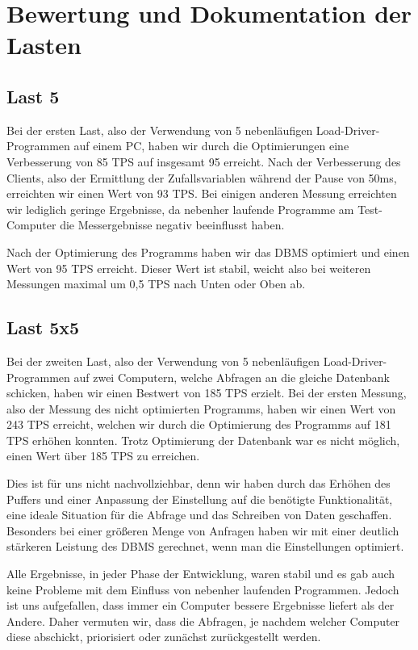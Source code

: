 \section{Bewertung und Dokumentation der Lasten}

\subsection{Last 5}
Bei der ersten Last, also der Verwendung von 5 nebenläufigen
Load-Driver-Programmen auf einem PC, haben wir durch die Optimierungen eine
Verbesserung von 85 TPS auf insgesamt 95 erreicht. Nach der Verbesserung des
Clients, also der Ermittlung der Zufallsvariablen während der Pause von 50ms,
erreichten wir einen Wert von 93 TPS. Bei einigen anderen Messung erreichten
wir lediglich geringe Ergebnisse, da nebenher laufende Programme am
Test-Computer die Messergebnisse negativ beeinflusst haben.

Nach der Optimierung des Programms haben wir das DBMS optimiert und einen Wert
von 95 TPS erreicht. Dieser Wert ist stabil, weicht also bei weiteren Messungen
maximal um 0,5 TPS nach Unten oder Oben ab.


\subsection{Last 5x5}
Bei der zweiten Last, also der Verwendung von 5 nebenläufigen
Load-Driver-Programmen auf zwei Computern, welche Abfragen an die gleiche
Datenbank schicken, haben wir einen Bestwert von 185 TPS erzielt. Bei der
ersten Messung, also der Messung des nicht optimierten Programms, haben wir
einen Wert von 243 TPS erreicht, welchen wir durch die Optimierung des
Programms auf 181 TPS erhöhen konnten. Trotz Optimierung der Datenbank war es
nicht möglich, einen Wert über 185 TPS zu erreichen.

Dies ist für uns nicht nachvollziehbar, denn wir haben durch das Erhöhen des
Puffers und einer Anpassung der Einstellung auf die benötigte Funktionalität,
eine ideale Situation für die Abfrage und das Schreiben von Daten geschaffen.
Besonders bei einer größeren Menge von Anfragen haben wir mit einer deutlich
stärkeren Leistung des DBMS gerechnet, wenn man die Einstellungen optimiert.

Alle Ergebnisse, in jeder Phase der Entwicklung, waren stabil und es gab auch
keine Probleme mit dem Einfluss von nebenher laufenden Programmen. Jedoch ist
uns aufgefallen, dass immer ein Computer bessere Ergebnisse liefert als der
Andere. Daher vermuten wir, dass die Abfragen, je nachdem welcher Computer diese
abschickt, priorisiert oder zunächst zurückgestellt werden.

